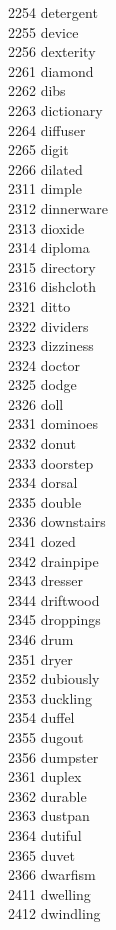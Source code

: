 2254 detergent \\
2255 device \\
2256 dexterity \\
2261 diamond \\
2262 dibs \\
2263 dictionary \\
2264 diffuser \\
2265 digit \\
2266 dilated \\
2311 dimple \\
2312 dinnerware \\
2313 dioxide \\
2314 diploma \\
2315 directory \\
2316 dishcloth \\
2321 ditto \\
2322 dividers \\
2323 dizziness \\
2324 doctor \\
2325 dodge \\
2326 doll \\
2331 dominoes \\
2332 donut \\
2333 doorstep \\
2334 dorsal \\
2335 double \\
2336 downstairs \\
2341 dozed \\
2342 drainpipe \\
2343 dresser \\
2344 driftwood \\
2345 droppings \\
2346 drum \\
2351 dryer \\
2352 dubiously \\
2353 duckling \\
2354 duffel \\
2355 dugout \\
2356 dumpster \\
2361 duplex \\
2362 durable \\
2363 dustpan \\
2364 dutiful \\
2365 duvet \\
2366 dwarfism \\
2411 dwelling \\
2412 dwindling \\
